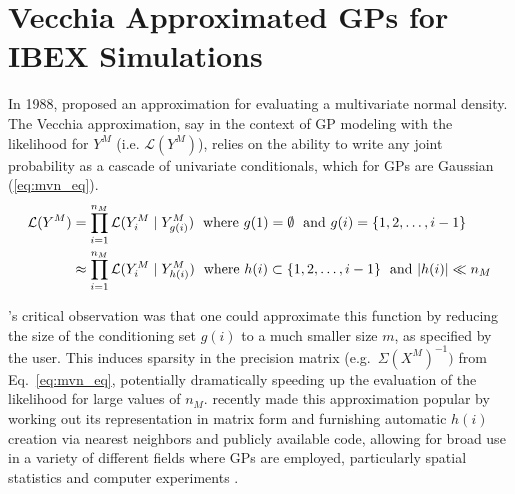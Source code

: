 \documentclass[11pt]{article}
\begin{document}

\section{Vecchia Approximated GPs for IBEX Simulations}
\label{sec:vecchia}

In 1988, \citeauthor{vecchia1988estimation} proposed an approximation for
evaluating a multivariate normal density. The Vecchia approximation, say in the
context of GP modeling with the likelihood for $Y^M$ (i.e. $\mathcal{L}(Y^M)$),
relies on the ability to write any joint probability as a cascade of univariate
conditionals, which for GPs are Gaussian (\ref{eq:mvn_eq}).
\begin{align}
\mathcal{L}(Y^M)&=\prod_{i=1}^{n_M} \mathcal{L}(Y^M_i \mid Y^M_{g(i)})
\hspace{0.3em} \mbox{ where } g(1)=\emptyset \hspace{0.3em} \mbox{ and }
g(i)=\{1, 2, \ldots, i-1\} \nonumber \\
&\approx \prod_{i=1}^{n_M}\mathcal{L}(Y^M_i \mid Y^M_{h(i)}) \hspace{0.3em} \mbox{
where } h(i) \subset \{1, 2, \ldots, i-1\} \hspace{0.3em} \mbox{ and } |h(i)| \ll n_M
\label{eq:vecchia}
\end{align}

\citeauthor{vecchia1988estimation}'s critical observation was that one could
approximate this function by reducing the size of the conditioning set $g(i)$ to
a much smaller size $m$, as specified by the user. This induces sparsity in the
precision matrix (e.g.~$\Sigma(X^M)^{-1})$ from Eq.~\ref{eq:mvn_eq}, potentially
dramatically speeding up the evaluation of the likelihood for large values of
$n_M$. \citet{katzfuss2021general} recently made this approximation popular by
working out its representation in matrix form and furnishing automatic $h(i)$
creation via nearest neighbors and publicly available code, allowing for broad
use in a variety of different fields where GPs are employed, particularly
spatial statistics and computer experiments
\citep{guinness2018permutation,katzfuss2020vecchia,katzfuss2021general,zhang2022multi,sauer2023vecchia}.
\end{document}
